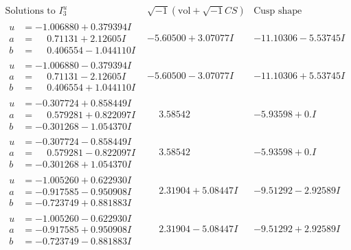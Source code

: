 \documentclass[1p]{elsarticle_modified}
\theoremstyle{definition}
\newcommand{\I}{\sqrt{-1}}
\begin{document}
$$\begin{array}{c|c|c}  
\text{Solutions to }I^u_{3}& \I (\text{vol} + \sqrt{-1}CS) & \text{Cusp shape}\\
 \hline 
\begin{aligned}
u &= -1.006880 + 0.379394 I \\
a &= \phantom{-}0.71131 + 2.12605 I \\
b &= \phantom{-}0.406554 - 1.044110 I\end{aligned}
 & -5.60500 + 3.07077 I & -11.10306 - 5.53745 I \\ \hline\begin{aligned}
u &= -1.006880 - 0.379394 I \\
a &= \phantom{-}0.71131 - 2.12605 I \\
b &= \phantom{-}0.406554 + 1.044110 I\end{aligned}
 & -5.60500 - 3.07077 I & -11.10306 + 5.53745 I \\ \hline\begin{aligned}
u &= -0.307724 + 0.858449 I \\
a &= \phantom{-}0.579281 + 0.822097 I \\
b &= -0.301268 - 1.054370 I\end{aligned}
 & \phantom{-}3.58542\phantom{ +0.000000I} & -5.93598 + 0. I\phantom{ +0.000000I} \\ \hline\begin{aligned}
u &= -0.307724 - 0.858449 I \\
a &= \phantom{-}0.579281 - 0.822097 I \\
b &= -0.301268 + 1.054370 I\end{aligned}
 & \phantom{-}3.58542\phantom{ +0.000000I} & -5.93598 + 0. I\phantom{ +0.000000I} \\ \hline\begin{aligned}
u &= -1.005260 + 0.622930 I \\
a &= -0.917585 - 0.950908 I \\
b &= -0.723749 + 0.881883 I\end{aligned}
 & \phantom{-}2.31904 + 5.08447 I & -9.51292 - 2.92589 I \\ \hline\begin{aligned}
u &= -1.005260 - 0.622930 I \\
a &= -0.917585 + 0.950908 I \\
b &= -0.723749 - 0.881883 I\end{aligned}
 & \phantom{-}2.31904 - 5.08447 I & -9.51292 + 2.92589 I \\ \hline\begin{aligned}

\end{aligned}
\end{array}$$
\end{document}
